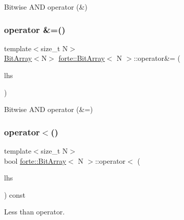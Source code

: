 Bitwise A\+ND operator (\&) 

\mbox{\label{classforte_1_1_bit_array_aaff16cc742d2f2af9dd32636310b17e3}} 
\subsubsection{\texorpdfstring{operator \&=()}{operator \&=()}}
{\footnotesize\ttfamily template$<$size\+\_\+t N$>$ \\
\mbox{\hyperlink{classforte_1_1_bit_array}{Bit\+Array}}$<$N$>$ \mbox{\hyperlink{classforte_1_1_bit_array}{forte\+::\+Bit\+Array}}$<$ N $>$\+::operator\&= (\begin{DoxyParamCaption}\item[{const \mbox{\hyperlink{classforte_1_1_bit_array}{Bit\+Array}}$<$ N $>$ \&}]{lhs }\end{DoxyParamCaption})\hspace{0.3cm}{\ttfamily [inline]}}



Bitwise A\+ND operator (\&=) 

\mbox{\label{classforte_1_1_bit_array_adce1757202af90d3a37ca08d32f0d778}} 
\subsubsection{\texorpdfstring{operator$<$()}{operator<()}}
{\footnotesize\ttfamily template$<$size\+\_\+t N$>$ \\
bool \mbox{\hyperlink{classforte_1_1_bit_array}{forte\+::\+Bit\+Array}}$<$ N $>$\+::operator$<$ (\begin{DoxyParamCaption}\item[{const \mbox{\hyperlink{classforte_1_1_bit_array}{Bit\+Array}}$<$ N $>$ \&}]{lhs }\end{DoxyParamCaption}) const\hspace{0.3cm}{\ttfamily [inline]}}



Less than operator. 

\mbox{\label{classforte_1_1_bit_array_abe6a395fc267c35a66224344a43f2cb2}} 
